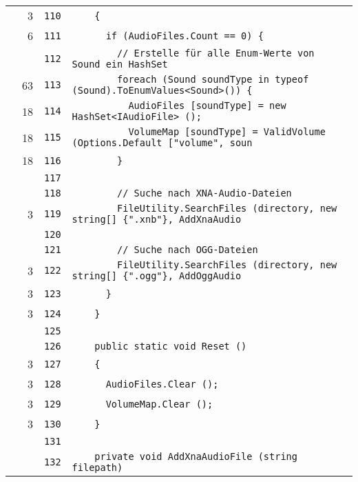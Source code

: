 \documentclass[a4paper,10pt]{article}
\begin{document}
\begin{longtable}[l]{lrrl}
\cellcolor{green} & 3 & \verb~110~ & \verb~    {~\\
\cellcolor{green} & 6 & \verb~111~ & \verb~      if (AudioFiles.Count == 0) {~\\
\cellcolor{gray} &  & \verb~112~ & \verb~        // Erstelle für alle Enum-Werte von Sound ein HashSet~\\
\cellcolor{green} & 63 & \verb~113~ & \verb~        foreach (Sound soundType in typeof (Sound).ToEnumValues<Sound>()) {~\\
\cellcolor{green} & 18 & \verb~114~ & \verb~          AudioFiles [soundType] = new HashSet<IAudioFile> ();~\\
\cellcolor{green} & 18 & \verb~115~ & \verb~          VolumeMap [soundType] = ValidVolume (Options.Default ["volume", soun~\\
\cellcolor{green} & 18 & \verb~116~ & \verb~        }~\\
\cellcolor{gray} &  & \verb~117~ & \verb~~\\
\cellcolor{gray} &  & \verb~118~ & \verb~        // Suche nach XNA-Audio-Dateien~\\
\cellcolor{green} & 3 & \verb~119~ & \verb~        FileUtility.SearchFiles (directory, new string[] {".xnb"}, AddXnaAudio~\\
\cellcolor{gray} &  & \verb~120~ & \verb~~\\
\cellcolor{gray} &  & \verb~121~ & \verb~        // Suche nach OGG-Dateien~\\
\cellcolor{green} & 3 & \verb~122~ & \verb~        FileUtility.SearchFiles (directory, new string[] {".ogg"}, AddOggAudio~\\
\cellcolor{green} & 3 & \verb~123~ & \verb~      }~\\
\cellcolor{green} & 3 & \verb~124~ & \verb~    }~\\
\cellcolor{gray} &  & \verb~125~ & \verb~~\\
\cellcolor{gray} &  & \verb~126~ & \verb~    public static void Reset ()~\\
\cellcolor{green} & 3 & \verb~127~ & \verb~    {~\\
\cellcolor{green} & 3 & \verb~128~ & \verb~      AudioFiles.Clear ();~\\
\cellcolor{green} & 3 & \verb~129~ & \verb~      VolumeMap.Clear ();~\\
\cellcolor{green} & 3 & \verb~130~ & \verb~    }~\\
\cellcolor{gray} &  & \verb~131~ & \verb~~\\
\cellcolor{gray} &  & \verb~132~ & \verb~    private void AddXnaAudioFile (string filepath)~\\

\end{longtable}
\end{document}
